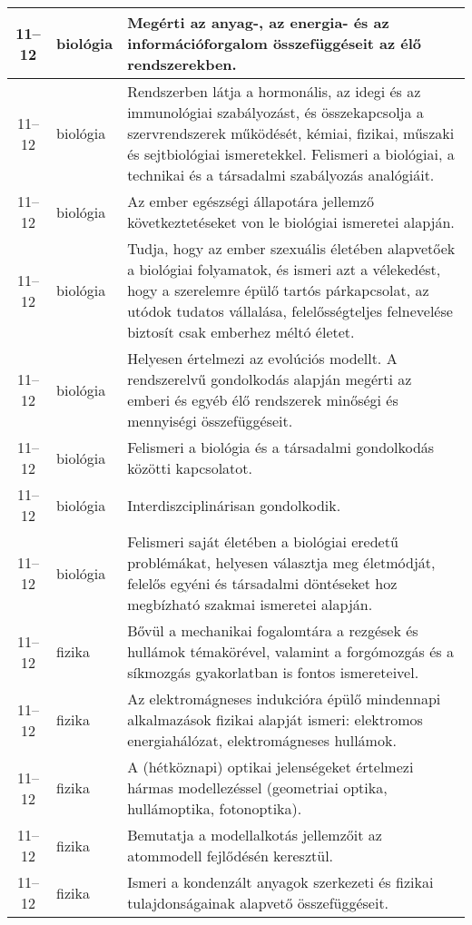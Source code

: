 \begin{small}
\begin{longtable}{c | p{2cm} |  p{11cm} }
              11--12 & biológia & Megérti az anyag-, az energia- és az információforgalom összefüggéseit az élő rendszerekben. \\ \hline
              11--12 & biológia & Rendszerben látja a hormonális, az idegi és az immunológiai szabályozást, és összekapcsolja a szervrendszerek működését, kémiai, fizikai, műszaki és sejtbiológiai ismeretekkel. Felismeri a biológiai, a technikai és a társadalmi szabályozás analógiáit. \\ \hline
              11--12 & biológia & Az ember egészségi állapotára jellemző következtetéseket von le biológiai ismeretei alapján. \\ \hline
              11--12 & biológia & Tudja, hogy az ember szexuális életében alapvetőek a biológiai folyamatok, és ismeri azt a vélekedést, hogy a szerelemre épülő tartós párkapcsolat, az utódok tudatos vállalása, felelősségteljes felnevelése biztosít csak emberhez méltó életet. \\ \hline
              11--12 & biológia & Helyesen értelmezi az evolúciós modellt. A rendszerelvű gondolkodás alapján megérti az emberi és egyéb élő rendszerek minőségi és mennyiségi összefüggéseit. \\ \hline
              11--12 & biológia & Felismeri a biológia és a társadalmi gondolkodás közötti kapcsolatot. \\ \hline
              11--12 & biológia & Interdiszciplinárisan gondolkodik. \\ \hline
              11--12 & biológia & Felismeri saját életében a biológiai eredetű problémákat, helyesen választja meg életmódját, felelős egyéni és társadalmi döntéseket hoz megbízható szakmai ismeretei alapján. \\ \hline
              11--12 & fizika & Bővül a mechanikai fogalomtára a rezgések és hullámok témakörével, valamint a forgómozgás és a síkmozgás gyakorlatban is fontos ismereteivel. \\ \hline
              11--12 & fizika & Az elektromágneses indukcióra épülő mindennapi alkalmazások fizikai alapját ismeri: elektromos energiahálózat, elektromágneses hullámok. \\ \hline
              11--12 & fizika & A (hétköznapi) optikai jelenségeket értelmezi hármas modellezéssel (geometriai optika, hullámoptika, fotonoptika). \\ \hline
              11--12 & fizika & Bemutatja a modellalkotás jellemzőit az atommodell fejlődésén keresztül. \\ \hline
              11--12 & fizika & Ismeri a kondenzált anyagok szerkezeti és fizikai tulajdonságainak alapvető összefüggéseit. \\ \hline

\end{longtable}
\end{small}
